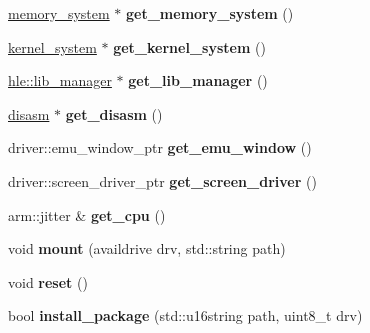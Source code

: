\begin{DoxyCompactItemize}
\mbox{\hyperlink{classeka2l1_1_1memory__system}{memory\+\_\+system}} $\ast$ {\bfseries get\+\_\+memory\+\_\+system} ()
\item 
\mbox{\label{classeka2l1_1_1system_aae5f75e5dabec4af26a706432fbe35bf}} 
\mbox{\hyperlink{classeka2l1_1_1kernel__system}{kernel\+\_\+system}} $\ast$ {\bfseries get\+\_\+kernel\+\_\+system} ()
\item 
\mbox{\label{classeka2l1_1_1system_a348bd82ffddbfd4570a98f79397f391a}} 
\mbox{\hyperlink{classeka2l1_1_1hle_1_1lib__manager}{hle\+::lib\+\_\+manager}} $\ast$ {\bfseries get\+\_\+lib\+\_\+manager} ()
\item 
\mbox{\label{classeka2l1_1_1system_ab9ea8ae5cc6d67ad47201f4ccf353c43}} 
\mbox{\hyperlink{classeka2l1_1_1disasm}{disasm}} $\ast$ {\bfseries get\+\_\+disasm} ()
\item 
\mbox{\label{classeka2l1_1_1system_a8455730be0997fe0f80af593bd495425}} 
driver\+::emu\+\_\+window\+\_\+ptr {\bfseries get\+\_\+emu\+\_\+window} ()
\item 
\mbox{\label{classeka2l1_1_1system_add76d4bfcdf7726285a9c3347ead3254}} 
driver\+::screen\+\_\+driver\+\_\+ptr {\bfseries get\+\_\+screen\+\_\+driver} ()
\item 
\mbox{\label{classeka2l1_1_1system_a898a3586360af36e89a17bd9e029962e}} 
arm\+::jitter \& {\bfseries get\+\_\+cpu} ()
\item 
\mbox{\label{classeka2l1_1_1system_ade7987e740046c9e1b968e5cdfa89ab0}} 
void {\bfseries mount} (availdrive drv, std\+::string path)
\item 
\mbox{\label{classeka2l1_1_1system_aa845965e71e572080fa9cdae82b61c73}} 
void {\bfseries reset} ()
\item 
\mbox{\label{classeka2l1_1_1system_ac4f1929a2406f237b20dca2d069508b8}} 
bool {\bfseries install\+\_\+package} (std\+::u16string path, uint8\+\_\+t drv)
\item 
\mbox{\label{classeka2l1_1_1system_a637207347cd592e2efa7a1ede0802728}} 

\end{DoxyCompactItemize}
